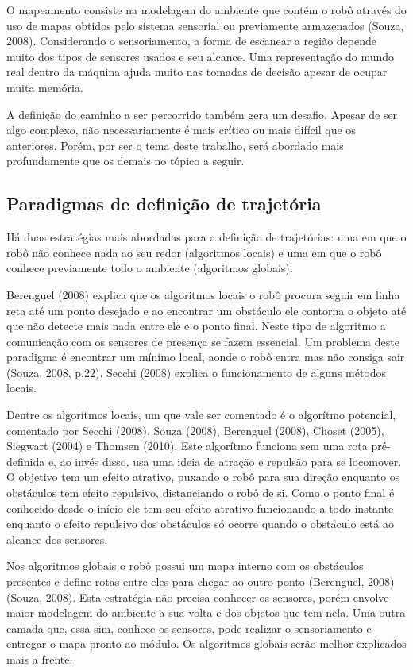 O mapeamento consiste na modelagem do ambiente que contém o robô através do uso de mapas obtidos pelo sistema sensorial ou previamente armazenados (Souza, 2008). Considerando o sensoriamento, a forma de escanear a região depende muito dos tipos de sensores usados e seu alcance. Uma representação do mundo real dentro da máquina ajuda muito nas tomadas de decisão apesar de ocupar muita memória.

A definição do caminho a ser percorrido também gera um desafio. Apesar de ser algo complexo, não necessariamente é mais crítico ou mais difícil que os anteriores. Porém, por ser o tema deste trabalho, será abordado mais profundamente que os demais no tópico a seguir.

\subsection{Paradigmas de definição de trajetória}

Há duas estratégias mais abordadas para a definição de trajetórias: uma em que o robô não conhece nada ao seu redor (algoritmos locais) e uma em que o robô conhece previamente todo o ambiente (algoritmos globais).

Berenguel (2008) explica que os algoritmos locais o robô procura seguir em linha reta até um ponto desejado e ao encontrar um obstáculo ele contorna o objeto até que não detecte mais nada entre ele e o ponto final. Neste tipo de algoritmo a comunicação com os sensores de presença se fazem essencial. Um problema deste paradigma é encontrar um mínimo local, aonde o robô entra mas não consiga sair (Souza, 2008, p.22). Secchi (2008) explica o funcionamento de alguns métodos locais. 

Dentre os algorítmos locais, um que vale ser comentado é o algorítmo potencial, comentado por Secchi (2008), Souza (2008), Berenguel (2008), Choset (2005), Siegwart (2004) e Thomsen (2010). Este algorítmo funciona sem uma rota pré-definida e, ao invés disso, usa uma ideia de atração e repulsão para se locomover. O objetivo tem um efeito atrativo, puxando o robô para sua direção enquanto os obstáculos tem efeito repulsivo, distanciando o robô de si. Como o ponto final é conhecido desde o início ele tem seu efeito atrativo funcionando a todo instante enquanto o efeito repulsivo dos obstáculos só ocorre quando o obstáculo está ao alcance dos sensores.

Nos algoritmos globais o robô possui um mapa interno com os obstáculos presentes e define rotas entre eles para chegar ao outro ponto (Berenguel, 2008) (Souza, 2008). Esta estratégia não precisa conhecer os sensores, porém envolve maior modelagem do ambiente a sua volta e dos objetos que tem nela. Uma outra camada que, essa sim, conhece os sensores, pode realizar o sensoriamento e entregar o mapa pronto ao módulo. Os algoritmos globais serão melhor explicados mais a frente.

